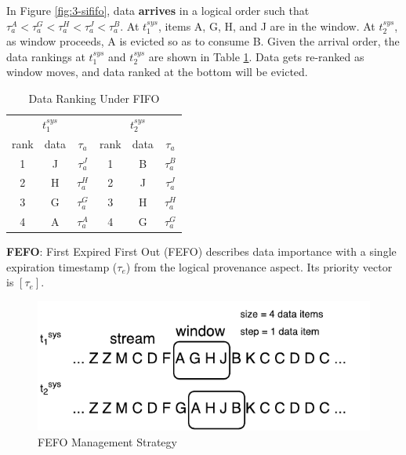 In Figure \ref{fig:3-sififo}, data \textbf{arrives} in a logical order such that $\tau^{A}_{a} < \tau^{G}_{a} < \tau^{H}_{a} < \tau^{J}_{a} < \tau^{B}_{a}$.
At $t^{sys}_{1}$, items A, G, H, and J are in the window. 
At $t^{sys}_{2}$, as window proceeds, A is evicted so as to consume B. 
Given the arrival order, the data rankings at $t^{sys}_{1}$ and $t^{sys}_{2}$ are shown in Table \ref{tab:fifo}.
Data gets re-ranked as window moves, and data ranked at the bottom will be evicted.

\begin{table}[!htbp]
\centering
\caption{Data Ranking Under FIFO}
\label{tab:fifo}
\begin{tabular}{|c|c|c||c|c|c|}
\hline
\multicolumn{3}{|c||}{$t^{sys}_{1}$} & \multicolumn{3}{c|}{$t^{sys}_{2}$} \\ \hhline{|======|}
rank & data & $\tau_{a}$ & rank & data & $\tau_{a}$ \\ \hhline{|=|=|=#=|=|=|}
1 & J & $\tau^{J}_{a}$ & 1 & B & $\tau^{B}_{a}$ \\ \hline
2 & H & $\tau^{H}_{a}$ & 2 & J & $\tau^{J}_{a}$ \\ \hline
3 & G & $\tau^{G}_{a}$ & 3 & H & $\tau^{H}_{a}$ \\ \hline
4 & A & $\tau^{A}_{a}$ & 4 & G & $\tau^{G}_{a}$ \\ \hline
\end{tabular}
\end{table}

\textbf{FEFO}:
First Expired First Out (FEFO) describes data importance with a single expiration timestamp ($\tau_{e}$) from the logical provenance aspect. 
Its priority vector is $[\tau_{e}]$.

\begin{figure}[!htbp]
	\centering
    \includegraphics[width=5in]{img/3-sifefo.pdf}
    \caption{FEFO Management Strategy}
    \label{fig:3-sifefo}
\end{figure}

